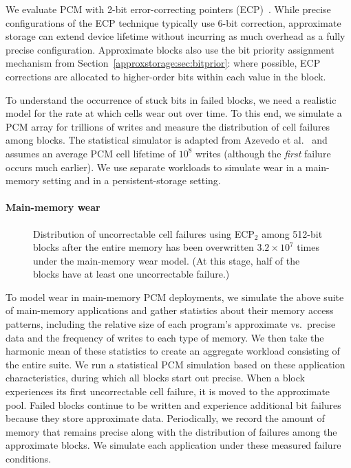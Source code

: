 We evaluate PCM with 2-bit error-correcting pointers (ECP)~\cite{ecp}.
While precise configurations of the ECP technique typically use 6-bit
correction, approximate storage can extend device lifetime without incurring as
much overhead as a fully precise configuration.
Approximate blocks also use the bit priority assignment mechanism from
Section~\ref{approxstorage:sec:bitprior}: where possible, ECP corrections are allocated to
higher-order bits within each value in the block.

To understand the occurrence of stuck bits in failed blocks,
we need a realistic model for the rate at which cells wear out over time.
To this end,
we simulate a PCM array for trillions of writes and
measure the distribution of cell failures among blocks.
The statistical simulator is adapted from Azevedo et al.~\cite{zombie} and
assumes an average PCM cell lifetime of $10^8$ writes (although
the \emph{first} failure occurs much earlier).
We use separate
workloads to simulate wear in a main-memory setting and in a persistent-storage
setting.

\paragraph{Main-memory wear}

\begin{figure}[t]
    \centering
    
    \caption{
        Distribution of uncorrectable cell failures using ECP$_2$ among
        512-bit blocks
        after the entire memory has been overwritten
        $3.2 \times 10^{7}$ times under the main-memory wear model. (At this
        stage, half of the blocks have at least one uncorrectable failure.)
    }
    \label{approxstorage:fig:hist}
\end{figure}

To model wear in main-memory PCM deployments, we simulate the above suite of main-memory
applications and gather statistics about their memory access patterns,
including the relative size of each program's approximate vs.~precise
data and the frequency of writes to each type of memory. We then take
the harmonic mean of these statistics to create an aggregate workload
consisting of the entire suite. We run a statistical PCM
simulation based on these application characteristics, during which
all blocks start out precise. When a block experiences
its first uncorrectable cell failure, it is moved to the approximate
pool. Failed blocks
continue to be written and experience additional bit failures because they store
approximate data. Periodically, we record the amount of
memory that remains precise along with the distribution of failures
among the approximate blocks.
We simulate each application under these measured failure conditions.

